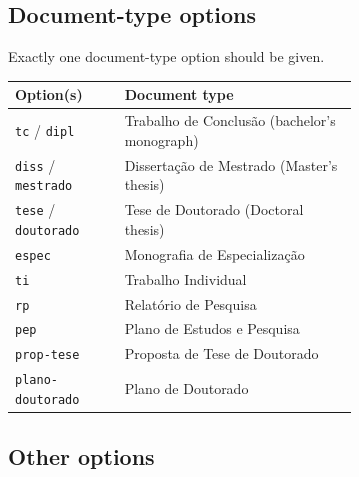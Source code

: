 \documentclass[11pt,a4paper]{article}
\newcommand{\opt}[1]{\texttt{#1}}
\begin{document}
\subsection{Document-type options}
\label{sec:doctypeopts}

Exactly one document-type option should be given.

\begin{center}
\begin{tabular}{@{}lp{0.68\linewidth}@{}}
  \toprule
  Option(s)              & Document type \\
  \midrule
  \opt{tc} / \opt{dipl}             & Trabalho de Conclusão (bachelor's monograph) \\
  \opt{diss} / \opt{mestrado}       & Dissertação de Mestrado (Master's thesis) \\
  \opt{tese} / \opt{doutorado}      & Tese de Doutorado (Doctoral thesis) \\
  \opt{espec}                       & Monografia de Especialização \\
  \opt{ti}                          & Trabalho Individual \\
  \opt{rp}                          & Relatório de Pesquisa \\
  \opt{pep}                         & Plano de Estudos e Pesquisa \\
  \opt{prop-tese}                   & Proposta de Tese de Doutorado \\
  \opt{plano-doutorado}             & Plano de Doutorado \\
  \bottomrule
\end{tabular}
\end{center}

\subsection{Other options}
\label{sec:otheropts}
\end{document}
